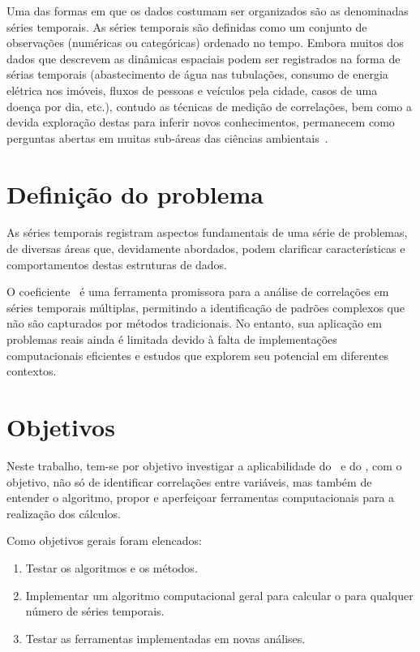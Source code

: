Uma das formas em que os dados costumam ser organizados são as denominadas séries temporais. As séries temporais são definidas como um conjunto de observações (numéricas ou categóricas) ordenado no tempo.  Embora muitos dos dados que descrevem as dinâmicas espaciais podem ser registrados na forma de sérias temporais (abastecimento de água nas tubulações, consumo de energia elétrica nos imóveis, fluxos de pessoas e veículos pela cidade, casos de uma doença por dia, etc.), contudo as técnicas de medição de correlações, bem como a devida exploração destas para inferir novos conhecimentos, permanecem como perguntas abertas em muitas sub-áreas das ciências ambientais~\cite{Bermudez-Edo2018}.

\section{Definição do problema}
\label{sec:problema}

As séries temporais registram aspectos fundamentais de uma série de problemas, de diversas áreas que, devidamente abordados, podem clarificar características e comportamentos destas estruturas de dados. 

O coeficiente \dmc~é uma ferramenta promissora para a análise de correlações em séries temporais múltiplas, permitindo a identificação de padrões complexos que não são capturados por métodos tradicionais. No entanto, sua aplicação em problemas reais ainda é limitada devido à falta de implementações computacionais eficientes e estudos que explorem seu potencial em diferentes contextos.



\section{Objetivos}
\label{sec:Objetivos}

Neste trabalho, tem-se por objetivo investigar a aplicabilidade do \pdcca~e do \dmc, com o objetivo, não só de identificar correlações entre variáveis, mas também de entender o algoritmo, propor e aperfeiçoar ferramentas computacionais para a realização dos cálculos.

Como objetivos gerais foram elencados:

\begin{enumerate}
    \label{enum:obj_espec}
    \item  Testar os algoritmos e os métodos.
    \item Implementar um algoritmo computacional geral para calcular o \dmc para qualquer número de séries temporais.
    \item Testar as ferramentas implementadas em novas análises.
\end{enumerate}

